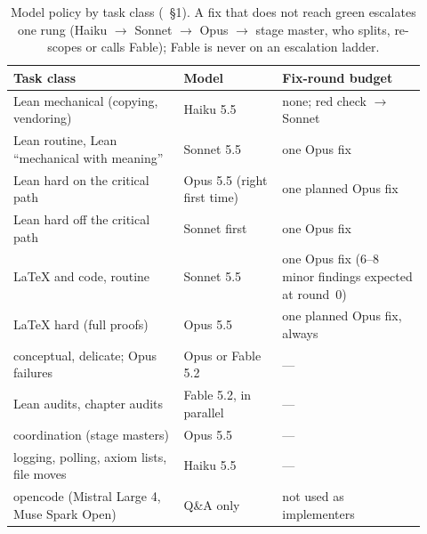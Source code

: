 \begin{table}[ht]
\centering\small\sloppy
\begin{tabular}{@{}p{0.38\linewidth}p{0.22\linewidth}p{0.32\linewidth}@{}}
\toprule
Task class & Model & Fix-round budget \\
\midrule
Lean mechanical (copying, vendoring) & Haiku 5.5 & none; red check $\to$ Sonnet \\
Lean routine, Lean ``mechanical with meaning'' & Sonnet 5.5 & one Opus fix \\
Lean hard on the critical path & Opus 5.5 (right first time) & one planned Opus fix \\
Lean hard off the critical path & Sonnet first & one Opus fix \\
LaTeX and code, routine & Sonnet 5.5 & one Opus fix (6--8 minor findings expected at round~0) \\
LaTeX hard (full proofs) & Opus 5.5 & one planned Opus fix, always \\
conceptual, delicate; Opus failures & Opus or Fable 5.2 & --- \\
Lean audits, chapter audits & Fable 5.2, in parallel & --- \\
coordination (stage masters) & Opus 5.5 & --- \\
logging, polling, axiom lists, file moves & Haiku 5.5 & --- \\
opencode (Mistral Large 4, Muse Spark Open) & Q\&A only & not used as implementers \\
\bottomrule
\end{tabular}
\caption{Model policy by task class (~\S1). A fix that does not reach green
escalates one rung (Haiku $\to$ Sonnet $\to$ Opus $\to$ stage master, who splits, re-scopes or calls Fable); Fable is
never on an escalation ladder.}\label{tab:agentic-models}
\end{table}

